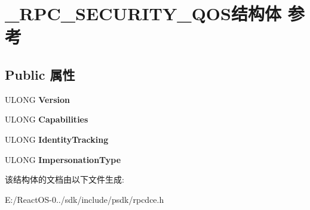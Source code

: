 \hypertarget{struct___r_p_c___s_e_c_u_r_i_t_y___q_o_s}{}\section{\+\_\+\+R\+P\+C\+\_\+\+S\+E\+C\+U\+R\+I\+T\+Y\+\_\+\+Q\+O\+S结构体 参考}
\label{struct___r_p_c___s_e_c_u_r_i_t_y___q_o_s}
\subsection*{Public 属性}
\begin{DoxyCompactItemize}
\item 
\mbox{\label{struct___r_p_c___s_e_c_u_r_i_t_y___q_o_s_a55158dc0e34c903163476cd2d69ea6c6}} 
U\+L\+O\+NG {\bfseries Version}
\item 
\mbox{\label{struct___r_p_c___s_e_c_u_r_i_t_y___q_o_s_ac44ab9a5586ff9fc0adc8e21c0d09e09}} 
U\+L\+O\+NG {\bfseries Capabilities}
\item 
\mbox{\label{struct___r_p_c___s_e_c_u_r_i_t_y___q_o_s_adac2a1cb732df399db136e630fb59a01}} 
U\+L\+O\+NG {\bfseries Identity\+Tracking}
\item 
\mbox{\label{struct___r_p_c___s_e_c_u_r_i_t_y___q_o_s_a2646ddfeed5e2edf30c37c3cafac0c87}} 
U\+L\+O\+NG {\bfseries Impersonation\+Type}
\end{DoxyCompactItemize}


该结构体的文档由以下文件生成\+:\begin{DoxyCompactItemize}
\item 
E\+:/\+React\+O\+S-\/0../sdk/include/psdk/rpcdce.\+h\end{DoxyCompactItemize}
